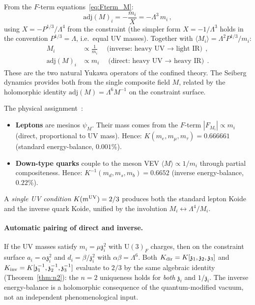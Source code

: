 \documentclass[aps,prd,twocolumn,showpacs,preprintnumbers,superscriptaddress,floatfix]{revtex4-2}
\makeatletter
\newcommand{\UU}{\mathrm{U}}
\newcommand{\adj}{\mathrm{adj}}
\newcommand{\ie}{i.e.\@}
\newcommand{\zch}{\mathfrak{z}}
\makeatother
\begin{document}
From the $F$-term equations~\eqref{eq:Fterm_M}:
\begin{equation}
  \adj(M)_i = -\frac{m_i}{X} = -\Lambda^3\,m_i\,,
  \label{eq:adjM_from_Fterm}
\end{equation}
using $X = -P^{1/3}/\Lambda^4$ from the constraint
(the simpler form $X = -1/\Lambda^3$ holds in the convention
$P^{1/3} = \Lambda$, \ie\ equal UV masses).
Together with $\langle M_i \rangle = \Lambda^2 P^{1/3}/m_i$:
\begin{align}
  M_i &\propto \frac{1}{m_i}
    \quad\text{(inverse: heavy UV $\to$ light IR)}\,,
    \label{eq:M_inverse}\\
  \adj(M)_i &\propto m_i
    \quad\text{(direct: heavy UV $\to$ heavy IR)}\,.
    \label{eq:adjM_direct}
\end{align}
These are the two natural Yukawa operators of the confined
theory.
The Seiberg dynamics provides both from the single composite
field $M$, related by the holomorphic identity
$\adj(M) = \Lambda^6 M^{-1}$ on the constraint surface.

The physical assignment~\cite{Seiberg:1994bz,CsakiSchmaltzSkiba:1997}:
\begin{itemize}
  \item \textbf{Leptons} are mesinos $\psi_M$.
    Their mass comes from the $F$-term
    $|F_{M_i}| \propto m_i$ (direct, proportional to UV mass).
    Hence: $K(m_e, m_\mu, m_\tau) = 0.666661$ (standard
    energy-balance, $0.001\%$).
  \item \textbf{Down-type quarks} couple to the meson VEV
    $\langle M \rangle \propto 1/m_i$ through partial
    compositeness.
    Hence: $K^{-1}(m_d, m_s, m_b) = 0.6652$ (inverse
    energy-balance, $0.22\%$).
\end{itemize}
A \emph{single UV condition} $K(m^{\rm UV}) = 2/3$ produces
both the standard lepton Koide and the inverse quark Koide,
unified by the involution $M_i \leftrightarrow \Lambda^4/M_i$.

\paragraph{Automatic pairing of direct and inverse.}
If the UV masses satisfy $m_i = \mu\zch_i^2$ with $\UU(3)_F$
charges, then on the constraint surface
$a_i = \alpha\zch_i^2$ and $d_i = \beta/\zch_i^2$ with
$\alpha\beta = \Lambda^6$.
Both $K_{\rm dir} = K[\zch_1,\zch_2,\zch_3]$ and
$K_{\rm inv} = K[\zch_1^{-1},\zch_2^{-1},\zch_3^{-1}]$
evaluate to $2/3$ by the same algebraic identity
(Theorem~\ref{thm:n2}): the $n = 2$ uniqueness holds for
\emph{both} $\zch_i$ and $1/\zch_i$.
The inverse energy-balance is a holomorphic consequence of the
quantum-modified vacuum, not an independent phenomenological
input.
\end{document}
